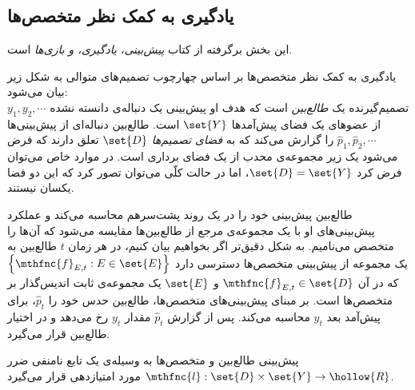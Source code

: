 
\subsection{
یادگیری به کمک نظر متخصص‌ها
}
این بخش برگرفته از کتاب 
\textit{
پیش‌بینی، یادگیری، و بازی‌ها
}\cite{predictionlearninggames2006}
است.


یادگیری به کمک نظر متخصص‌ها
بر اساس چهارچوب تصمیم‌های متوالی
به شکل زیر بیان می‌شود:\\
تصمیم‌گیرنده یک 
\textit{
طالع‌بین
} 
است که هدف او پیش‌بینی یک دنباله‌ی دانسته نشده 
$y_1, y_2, \cdots$ 
از عضوهای یک فضای پیش‌آمدها 
$\set{Y}$
است. طالع‌بین دنباله‌ای از پیش‌بینی‌ها
$\hat{p}_1, \hat{p}_2, \cdots$ 
را گزارش می‌کند که به 
\textit{
فضای تصمیم‌ها
} 
$\set{D}$ 
تعلق دارند که فرض می‌شود یک زیر مجموعه‌ی محدب از یک فضای برداری است. در موارد خاص می‌توان فرض کرد 
$\set{D} = \set{Y}$، 
اما در حالت کلّی می‌توان تصور کرد که این دو فضا یکسان نیستند.


طالع‌بین پیش‌بینی خود را در یک روند پشت‌سرهم محاسبه می‌کند و عملکرد پیش‌بینی‌های او با یک مجموعه‌ی مرجع از طالع‌بین‌ها مقایسه می‌شود که آن‌ها را متخصص می‌نامیم. به شکل دقیق‌تر اگر بخواهیم بیان کنیم، در هر زمان 
$t$ 
طالع‌بین به یک مجموعه از پیش‌بینی متخصص‌ها دسترسی دارد 
$\left\lbrace \mthfnc{f}_{E,t} : E \in \set{E} \right\rbrace$ 
که در آن 
$\mthfnc{f}_{E,t} \in \set{D}$ 
و 
$\set{E}$ 
یک مجموعه‌ی ثابت اندیس‌گذار بر متخصص‌ها است. بر مبنای پیش‌بینی‌های متخصص‌ها، طالع‌بین حدس خود را 
$\hat{p}_t$، 
برای پیش‌آمد بعد 
$y_t$ 
محاسبه می‌کند. پس از گزارش 
$\hat{p}_t$ 
مقدار 
$y_t$ 
رخ می‌دهد و در اختیار طالع‌بین قرار می‌گیرد.


پیش‌بینی طالع‌بین و متخصص‌ها به وسیله‌ی یک تابع نامنفی ضرر
$\mthfnc{l} : \set{D} \times \set{Y} \rightarrow \hollow{R}$ 
مورد امتیازدهی قرار می‌گیرد.

